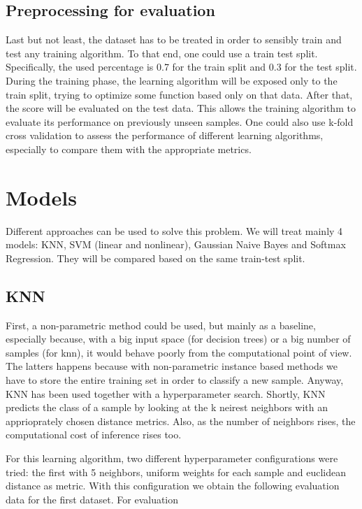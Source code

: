 \documentclass[12pt,a4paper,oneside]{article}
\begin{document}
\subsection{Preprocessing for evaluation}

Last but not least, the dataset has to be treated in order to sensibly train and
test any training algorithm. To that end, one could use a train test split.
Specifically, the used percentage is 0.7 for the train split and 0.3 for the
test split. During the training phase, the learning algorithm will be exposed
only to the train split, trying to optimize some function based only on that
data. After that, the score will be evaluated on the test data. This allows the
training algorithm to evaluate its performance on previously unseen samples. One
could also use k-fold cross validation to assess the performance of different
learning algorithms, especially to compare them with the appropriate metrics.


\section{Models}

Different approaches can be used to solve this problem. We will treat mainly 4
models: KNN, SVM (linear and nonlinear), Gaussian Naive Bayes and Softmax
Regression. They will be compared based on the same train-test split.

\subsection{KNN}

First, a non-parametric method could be used, but mainly as a baseline,
especially because, with a big input space (for decision trees) or a big number
of samples (for knn), it would behave poorly from the computational point of
view. The latters happens because with non-parametric instance based methods we
have to store the entire training set in order to classify a new sample. Anyway,
KNN has been used together with a hyperparameter search. Shortly, KNN predicts
the class of a sample by looking at the k neirest neighbors with an
apprioprately chosen distance metrics. Also, as the number of neighbors rises,
the computational cost of inference rises too.

For this learning algorithm, two different hyperparameter configurations were
tried: the first with 5 neighbors, uniform weights for each sample and euclidean
distance as metric. With this configuration we obtain the following evaluation
data for the first dataset. For evaluation
\end{document}

